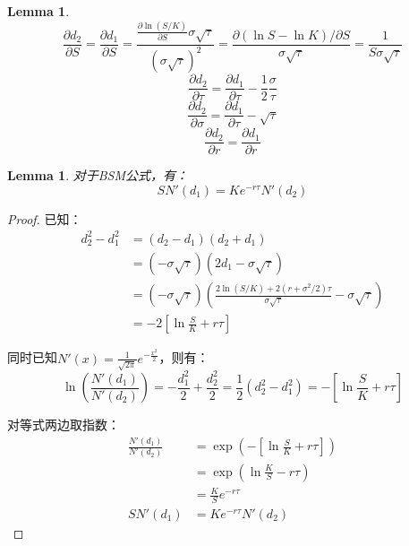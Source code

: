 \documentclass[11pt]{article}
\newtheorem{lemma}[theorem]{Lemma}
\begin{document}
\begin{lemma}
    \begin{equation*}
        \frac{\partial d_2}{\partial S} = \frac{\partial d_1}{\partial S} = \frac{\frac{\partial \ln(S/K)}{\partial S} \sigma \sqrt{\tau}}{(\sigma \sqrt{\tau})^2} = \frac{\partial (\ln S - \ln K)/\partial S}{\sigma\sqrt{\tau}} = \frac{1}{S\sigma\sqrt{\tau}}
    \end{equation*}
    \begin{equation*}
        \frac{\partial d_2}{\partial \tau} = \frac{\partial d_1}{\partial \tau} - \frac{1}{2}\frac{\sigma}{\tau}
    \end{equation*}
    \begin{equation*}
        \frac{\partial d_2}{\partial \sigma} = \frac{\partial d_1}{\partial \tau} - \sqrt{\tau}
    \end{equation*}
    \begin{equation*}
        \frac{\partial d_2}{\partial r} = \frac{\partial d_1}{\partial r}
    \end{equation*}
\end{lemma}

\begin{lemma}
    对于BSM公式，有：
    \begin{equation*}
        SN'(d_1) = Ke^{-r\tau} N'(d_2)
    \end{equation*}
\end{lemma}

\begin{proof}
    已知：
    \begin{align*}
        d_2^2-d_1^2 &= (d_2-d_1)(d_2+d_1) \\
        &= (-\sigma\sqrt{\tau})(2d_1-\sigma\sqrt{\tau}) \\
        &= (-\sigma\sqrt{\tau})\left( \frac{2\ln(S/K) + 2(r+\sigma^2/2)\tau}{\sigma\sqrt{\tau}} -\sigma\sqrt{\tau}\right) \\
        &= -2\left[\ln\frac{S}{K}+r\tau\right]
    \end{align*}

    同时已知$N'(x)=\frac{1}{\sqrt{2\pi}} e^{-\frac{x^2}{2}}$，则有：
    \begin{equation*}
        \ln\left(\frac{N'(d_1)}{N'(d_2)}\right)
        = -\frac{d_1^2}{2} + \frac{d_2^2}{2}
        = \frac{1}{2} (d_2^2-d_1^2)
        = -\left[\ln\frac{S}{K} +r\tau\right]
    \end{equation*}

    对等式两边取指数：
    \begin{align*}
        \frac{N'(d_1)}{N'(d_2)} 
        &= \exp\left( -\left[\ln\frac{S}{K} +r\tau\right] \right) \\
        &= \exp \left( \ln\frac{K}{S}-r\tau \right) \\
        &= \frac{K}{S} e^{-r\tau} \\
        SN'(d_1) &= Ke^{-r\tau} N'(d_2)
    \end{align*}
\end{proof}
\end{document}
